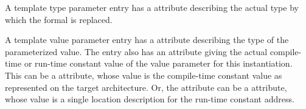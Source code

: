 A
template type parameter entry has a
\DWATtype{} attribute
describing the actual type by which the formal is replaced.


A template value parameter entry has a \DWATtype{} attribute 
describing the type of the parameterized value.
The entry also has an attribute giving the 
actual compile-time or run-time constant value 
of the value parameter for this instantiation.
This can be a 
\DWATconstvalue{} 
attribute, whose
value is the compile-time constant value as represented 
on the target architecture. 
Or, the attribute can be a \DWATlocation{} attribute, whose value is a 
single location description for the run-time constant address.

